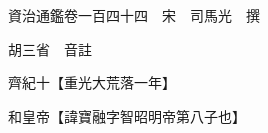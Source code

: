 










 


 
 


 

  
  
  
  
  





  
  
  
  
  
 
  

  

  
  
  



  

 
 

  
   




  

  
  


  　　資治通鑑卷一百四十四　宋　司馬光　撰

　　胡三省　音註

　　齊紀十【重光大荒落一年】

　　和皇帝【諱寶融字智昭明帝第八子也】

